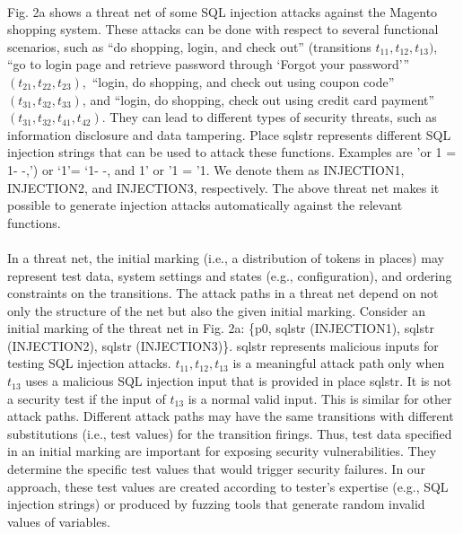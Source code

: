 \paragraph{}Fig. 2a shows a threat net of some SQL injection attacks against the Magento shopping system. These attacks can be done with respect to several functional scenarios, such as “do shopping, login, and check out” (transitions $t_{11}, t_{12}, t_{13})$, “go to login page and retrieve password through ‘Forgot your password’” $(t_{21}, t_{22}, t_{23}),$ “login, do shopping, and check out using coupon code” $(t_{31}, t_{32}, t_{33})$, and “login, do shopping, check out using credit card payment” $(t_31, t_32, t_41, t_42)$. They can lead to different types of security threats, such as information disclosure and data tampering. Place sqlstr
represents different SQL injection strings that can be used
to attack these functions. Examples are 'or 1 = 1- -,') or \lq1\rq = ‘1- -, and 1’ or '1 = '1. We denote them as INJECTION1, INJECTION2, and INJECTION3, respectively. The above threat net makes it possible to generate injection attacks
automatically against the relevant functions.
\paragraph{}In a threat net, the initial marking (i.e., a distribution of tokens in places) may represent test data, system settings and states (e.g., configuration), and ordering constraints on the transitions. The attack paths in a threat net depend on not only the structure of the net but also the given initial
marking. Consider an initial marking of the threat net in Fig. 2a: \{p0, sqlstr (INJECTION1), sqlstr (INJECTION2), sqlstr (INJECTION3)\}. sqlstr represents malicious inputs for testing SQL injection attacks. $t_{11}, t_{12}, t_{13}$ is a meaningful attack path only when $t_{13}$ uses a malicious SQL injection input that is provided in place sqlstr. It is not a security test if the input of
$t_{13}$ is a normal valid input. This is similar for other attack paths. Different attack paths may have the same transitions with different substitutions (i.e., test values) for the transition firings. Thus, test data specified in an initial marking are important for exposing security vulnerabilities. They determine the specific test values that would trigger security failures. In our approach, these test values are created according to tester’s expertise (e.g., SQL injection strings) or
produced by fuzzing tools that generate random invalid
values of variables.
